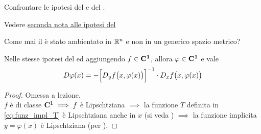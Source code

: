 \begin{exercise}
	Confrontare le ipotesi del  e del .
	\begin{solution}
		Vedere \hyperlink{note:teo_funz_impl_note_ipot1}{seconda nota alle ipotesi del }
	\end{solution}
\end{exercise}
\begin{exercise}
	Come mai il  è stato ambientato in $\mathbb{R}^n$ e non in un generico spazio metrico?
\end{exercise}
\begin{theorem}
	\label{teo:funz_impl_diff}
	Nelle stesse ipotesi del  ed aggiungendo $f \in \mathbf{C^{1}}$, allora $\varphi \in \mathbf{C^{1}}$ e vale
	\begin{equation}
		\label{eq:teo_funz_se_deriv_allora_deriv_tesi}
		D\varphi(x) = - \Bigl[ D_yf \bigl( x, \varphi(x) \bigr) \Bigr]^{-1} \cdot D_xf \bigl( x, \varphi(x) \bigr)
	\end{equation}
	\begin{proof}
		Omessa a lezione.\\
		\cbstart
		$f$ è di classe $\mathbf{C^{1}} \implies f$ è Lipschtziana $\implies$ la funzione $T$ definita in \cref{eq:funz_impl_T} è Lipschtziana anche in $x$ (si veda ) $\implies$ la funzione implicita $y = \varphi(x)$ è Lipschtziana (per ).


\end{proof}
\end{theorem}
